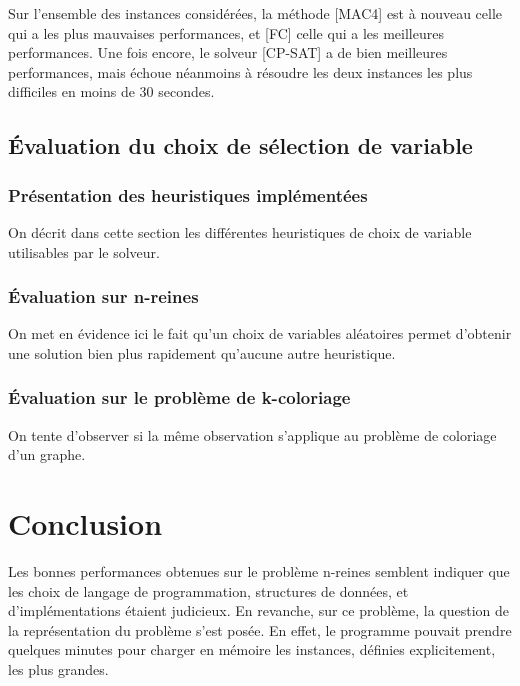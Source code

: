 \documentclass[14pt]{article}
\begin{document}
Sur l'ensemble des instances considérées, la méthode [MAC4] est à nouveau celle qui a les plus mauvaises performances, et [FC] celle qui a les meilleures performances. Une fois encore, le solveur [CP-SAT] a de bien meilleures performances, mais échoue néanmoins à résoudre les deux instances les plus difficiles en moins de 30 secondes.

\subsection{Évaluation du choix de sélection de variable}

\subsubsection{Présentation des heuristiques implémentées}

On décrit dans cette section les différentes heuristiques de choix de variable utilisables par le solveur.

\subsubsection{Évaluation sur n-reines}

On met en évidence ici le fait qu'un choix de variables aléatoires permet d'obtenir une solution bien plus rapidement qu'aucune autre heuristique.

\subsubsection{Évaluation sur le problème de k-coloriage}

On tente d'observer si la même observation s'applique au problème de coloriage d'un graphe.


\clearpage

\section{Conclusion}

Les bonnes performances obtenues sur le problème n-reines semblent indiquer que les choix de langage de programmation, structures de données, et d'implémentations étaient judicieux. En revanche, sur ce problème, la question de la représentation du problème s'est posée. En effet, le programme pouvait prendre quelques minutes pour charger en mémoire les instances, définies explicitement, les plus grandes.\\
\end{document}
